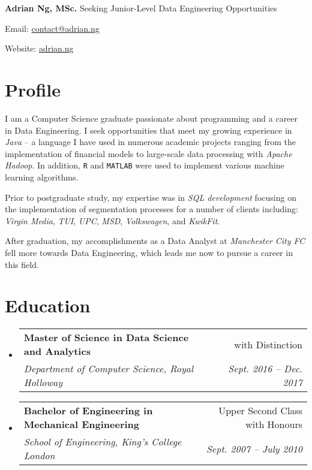 \documentclass[letterpaper,11pt]{article}
\makeatletter
\newcommand{\resumeSubheading}[4]{
	\vspace{-1pt}\item
	\begin{tabular*}{0.97\textwidth}{l@{\extracolsep{\fill}}r}
		\textbf{#1} & #2 \\
		\textit{\small#3} & \textit{\small #4} \\
	\end{tabular*}\vspace{-5pt}
}
\newcommand{\resumeSubHeadingListStart}{\begin{itemize}[leftmargin=*]}
\newcommand{\resumeSubHeadingListEnd}{\end{itemize}}
\makeatother
\begin{document}
\noindent
\Large \textbf{Adrian Ng, MSc.}
\newline
\small
Seeking Junior-Level Data Engineering Opportunities
\hfill
\begin{description*}
	\item [Email:] \href{mailto:contact@adrian.ng}{contact@adrian.ng}
	\item [Website:] \href{https://adrian.ng}{adrian.ng}
\end{description*}
\section{Profile}
\begin{paragraph}
	I am a Computer Science graduate passionate about programming and a career in Data Engineering. I seek opportunities that meet my growing experience in \textit{Java} -- a language I have used in numerous academic projects ranging from the implementation of financial models to large-scale data processing with \textit{Apache Hadoop}. In addition, \texttt{R} and \texttt{MATLAB} were used to implement various machine learning algorithms.
	\par
	Prior to postgraduate study, my expertise was in \textit{SQL development} focusing on the implementation of segmentation processes for a number of clients including: \textit{Virgin Media}, \textit{TUI}, \textit{UPC}, \textit{MSD}, \textit{Volkswagen}, and \textit{KwikFit}.
	\par
	After graduation, my accomplishments as a Data Analyst at \textit{Manchester City FC} fell more towards Data Engineering, which leads me now to pursue a career in this field.
\end{paragraph}
\section{Education}
\resumeSubHeadingListStart
\resumeSubheading
{Master of Science in Data Science and Analytics}{with Distinction}
{Department of Computer Science, Royal Holloway}{Sept. 2016 -- Dec. 2017}

\resumeSubheading
{Bachelor of Engineering in Mechanical Engineering}{Upper Second Class with Honours}
{School of Engineering, King's College London}{Sept. 2007 -- July 2010}
\resumeSubHeadingListEnd
\end{document}

